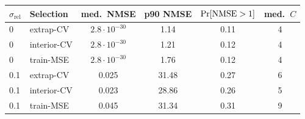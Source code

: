 \begin{tabular}{llcccc}
\toprule
$\sigma_{\mathrm{rel}}$ & Selection & med.\ NMSE & p90 NMSE & $\Pr[\mathrm{NMSE} > 1]$ & med.\ $C$ \\
\midrule
0 & extrap-CV & $2.8\!\cdot\!10^{-30}$ & 1.14 & 0.11 & 4 \\
0 & interior-CV & $2.8\!\cdot\!10^{-30}$ & 1.21 & 0.12 & 4 \\
0 & train-MSE & $2.8\!\cdot\!10^{-30}$ & 1.76 & 0.12 & 4 \\
\midrule
0.1 & extrap-CV & 0.025 & 31.48 & 0.27 & 6 \\
0.1 & interior-CV & 0.023 & 28.86 & 0.26 & 5 \\
0.1 & train-MSE & 0.045 & 31.34 & 0.31 & 9 \\
\bottomrule
\end{tabular}